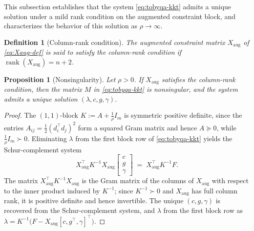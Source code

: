 \documentclass[11pt,a4paper]{article}
\newtheorem{proposition}[theorem]{Proposition}
\newtheorem{definition}[theorem]{Definition}
\begin{document}
This subsection establishes that the system \eqref{eq:tobyqa-kkt}
admits a unique solution under a mild rank condition on the augmented
constraint block, and characterizes the behavior of this solution
as $\rho \to \infty$.

\begin{definition}[Column-rank condition]\label{def:col-rank}
The augmented constraint matrix $X_{\mathrm{aug}}$ of
\eqref{eq:Xaug-def} is said to satisfy the \emph{column-rank
condition} if $\operatorname{rank}(X_{\mathrm{aug}}) = n + 2$.
\end{definition}

\begin{proposition}[Nonsingularity]\label{prop:M-nonsingular}
Let $\rho>0$. If $X_{\mathrm{aug}}$ satisfies the column-rank
condition, then the matrix $M$ in \eqref{eq:tobyqa-kkt} is nonsingular,
and the system admits a unique solution $(\lambda, c, g, \gamma)$.
\end{proposition}

\begin{proof}
The $(1,1)$-block $K := A + \tfrac{1}{\rho}I_m$ is symmetric positive
definite, since the entries $A_{ij} = \tfrac{1}{2}(d_i^\top d_j)^2$
form a squared Gram matrix and hence $A \succeq 0$, while
$\tfrac{1}{\rho}I_m \succ 0$. Eliminating $\lambda$ from the first
block row of \eqref{eq:tobyqa-kkt} yields the Schur-complement system
\[
  X_{\mathrm{aug}}^{\!\top} K^{-1} X_{\mathrm{aug}}
  \begin{bmatrix} c \\ g \\ \gamma \end{bmatrix}
  \;=\; X_{\mathrm{aug}}^{\!\top} K^{-1} F.
\]
The matrix $X_{\mathrm{aug}}^\top K^{-1} X_{\mathrm{aug}}$ is the
Gram matrix of the columns of $X_{\mathrm{aug}}$ with respect to the
inner product induced by $K^{-1}$; since $K^{-1} \succ 0$ and
$X_{\mathrm{aug}}$ has full column rank, it is positive definite and
hence invertible. The unique $(c, g, \gamma)$ is recovered from the
Schur-complement system, and $\lambda$ from the first block row as
$\lambda = K^{-1}\bigl(F - X_{\mathrm{aug}}[c, g^\top,
\gamma]^\top\bigr)$.
\end{proof}
\end{document}
